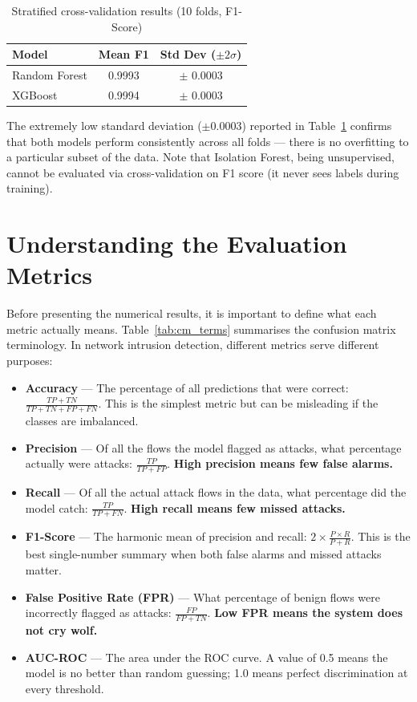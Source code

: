 \begin{table}[H]
\centering
\caption{Stratified cross-validation results (10 folds, F1-Score)}
\label{tab:cv_results}
\begin{tabular}{lcc}
\toprule
\textbf{Model} & \textbf{Mean F1} & \textbf{Std Dev ($\pm 2\sigma$)} \\
\midrule
Random Forest & 0.9993 & $\pm$ 0.0003 \\
XGBoost & 0.9994 & $\pm$ 0.0003 \\
\bottomrule
\end{tabular}
\end{table}

The extremely low standard deviation ($\pm 0.0003$) reported in Table~\ref{tab:cv_results} confirms that both models perform consistently across all folds --- there is no overfitting to a particular subset of the data. Note that Isolation Forest, being unsupervised, cannot be evaluated via cross-validation on F1 score (it never sees labels during training).

\section{Understanding the Evaluation Metrics}

Before presenting the numerical results, it is important to define what each metric actually means. Table~\ref{tab:cm_terms} summarises the confusion matrix terminology. In network intrusion detection, different metrics serve different purposes:

\begin{itemize}
    \item \textbf{Accuracy} — The percentage of all predictions that were correct: $\frac{TP + TN}{TP + TN + FP + FN}$. This is the simplest metric but can be misleading if the classes are imbalanced.

    \item \textbf{Precision} — Of all the flows the model flagged as attacks, what percentage actually were attacks: $\frac{TP}{TP + FP}$. \textbf{High precision means few false alarms.}

    \item \textbf{Recall} — Of all the actual attack flows in the data, what percentage did the model catch: $\frac{TP}{TP + FN}$. \textbf{High recall means few missed attacks.}

    \item \textbf{F1-Score} — The harmonic mean of precision and recall: $2 \times \frac{P \times R}{P + R}$. This is the best single-number summary when both false alarms and missed attacks matter.

    \item \textbf{False Positive Rate (FPR)} — What percentage of benign flows were incorrectly flagged as attacks: $\frac{FP}{FP + TN}$. \textbf{Low FPR means the system does not cry wolf.}

    \item \textbf{AUC-ROC} — The area under the ROC curve. A value of 0.5 means the model is no better than random guessing; 1.0 means perfect discrimination at every threshold.
\end{itemize}

